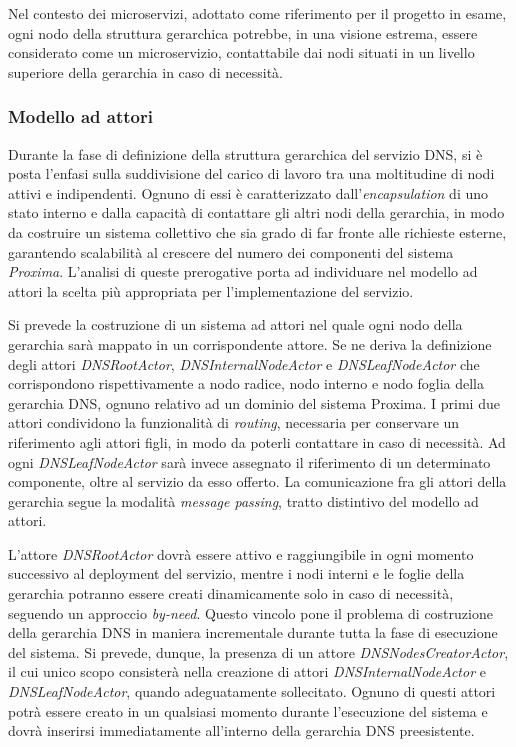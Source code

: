 \documentclass[a4paper,12pt]{report}
\begin{document}
Nel contesto dei microservizi, adottato come riferimento per il progetto in esame, ogni nodo della struttura gerarchica potrebbe, in una visione estrema, essere considerato come un microservizio, contattabile dai nodi situati in un livello superiore della gerarchia in caso di necessità.

\subsubsection{Modello ad attori} \label{dns-actormodel}
Durante la fase di definizione della struttura gerarchica del servizio DNS, si è posta l'enfasi sulla suddivisione del carico di lavoro tra una moltitudine di nodi attivi e indipendenti. Ognuno di essi è caratterizzato dall'\emph{encapsulation} di uno stato interno e dalla capacità di contattare gli altri nodi della gerarchia, in modo da costruire un sistema collettivo che sia grado di far fronte alle richieste esterne, garantendo scalabilità al crescere del numero dei componenti del sistema \emph{Proxima}. L'analisi di queste prerogative porta ad individuare nel modello ad attori la scelta più appropriata per l'implementazione del servizio.

Si prevede la costruzione di un sistema ad attori nel quale ogni nodo della gerarchia sarà mappato in un corrispondente attore. Se ne deriva la definizione degli attori \emph{DNSRootActor}, \emph{DNSInternalNodeActor} e \emph{DNSLeafNodeActor} che corrispondono rispettivamente a nodo radice, nodo interno e nodo foglia della gerarchia DNS, ognuno relativo ad un dominio del sistema Proxima. I primi due attori condividono la funzionalità di \emph{routing}, necessaria per conservare un riferimento agli attori figli, in modo da poterli contattare in caso di necessità. Ad ogni \emph{DNSLeafNodeActor} sarà invece assegnato il riferimento di un determinato componente, oltre al servizio da esso offerto. La comunicazione fra gli attori della gerarchia segue la modalità \emph{message passing}, tratto distintivo del modello ad attori.

L'attore \emph{DNSRootActor} dovrà essere attivo e raggiungibile in ogni momento successivo al deployment del servizio, mentre i nodi interni e le foglie della gerarchia potranno essere creati dinamicamente solo in caso di necessità, seguendo un approccio \emph{by-need}. Questo vincolo pone il problema di costruzione della gerarchia DNS in maniera incrementale durante tutta la fase di esecuzione del sistema. Si prevede, dunque, la presenza di un attore \emph{DNSNodesCreatorActor}, il cui unico scopo consisterà nella creazione di attori \emph{DNSInternalNodeActor} e \emph{DNSLeafNodeActor}, quando adeguatamente sollecitato. Ognuno di questi attori potrà essere creato in un qualsiasi momento durante l'esecuzione del sistema e dovrà inserirsi immediatamente all'interno della gerarchia DNS preesistente. 
\end{document}
